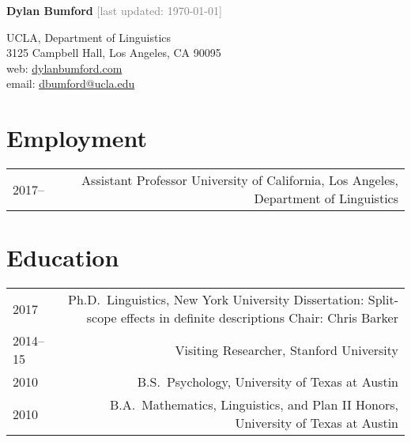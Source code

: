\documentclass[12pt]{article}
\begin{document}
\textbf{Dylan Bumford}\hfill
\textcolor{gray}{[last updated: \today]}

\bigskip

\begin{minipage}[t]{0.55\textwidth}
UCLA, Department of Linguistics\\
3125 Campbell Hall, Los Angeles, CA 90095
\\
web: \href{https://dylanbumford.com}{dylanbumford.com}\\
email: \href{mailto:dbumford@ucla.edu}{dbumford@ucla.edu}
\end{minipage}
\begin{minipage}[t]{\linegoal}
\raggedleft%
\end{minipage}

\bigskip
\bigskip

\section*{Employment}

\begin{longtable}{LR}
  2017--    & Assistant Professor\newline
              University of California, Los Angeles, Department of Linguistics
\end{longtable}

\medskip

\section*{Education}

\begin{longtable}{LR}
  2017        & Ph.D.~Linguistics, New York University\newline
                Dissertation: Split-scope effects in definite descriptions\newline
                Chair: Chris Barker
                \\
  2014--15    & Visiting Researcher, Stanford University\\
  2010        & B.S.~Psychology, University of Texas at Austin\\
  2010        & B.A.~Mathematics, Linguistics, and Plan II Honors, University of
                Texas at Austin
\end{longtable}
\end{document}
